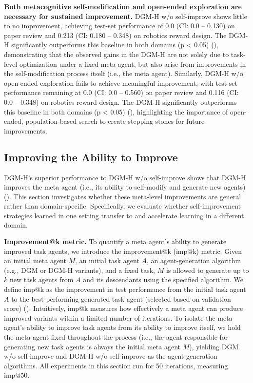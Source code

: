 \documentclass[]{fairmeta}
\begin{document}
\textbf{Both metacognitive self-modification and open-ended exploration are necessary for sustained improvement.}
DGM-H w/o self-improve \citep{huautomated} shows little to no improvement, achieving test-set performance of 0.0 (CI: 0.0 -- 0.130) on paper review and 0.213 (CI: 0.180 -- 0.348) on robotics reward design. The DGM-H significantly outperforms this baseline in both domains (p < 0.05) (), demonstrating that the observed gains in the DGM-H are not solely due to task-level optimization under a fixed meta agent, but also arise from improvements in the self-modification process itself (i.e., the meta agent).
Similarly, DGM-H w/o open-ended exploration fails to achieve meaningful improvement, with test-set performance remaining at 0.0 (CI: 0.0 -- 0.560) on paper review and 0.116 (CI: 0.0 -- 0.348) on robotics reward design. The DGM-H significantly outperforms this baseline in both domains (p < 0.05) (), highlighting the importance of open-ended, population-based search to create stepping stones for future improvements.

\subsection{Improving the Ability to Improve}
\label{sec:results-meta}

DGM-H's superior performance to DGM-H w/o self-improve shows that DGM-H improves the meta agent (i.e., its ability to self-modify and generate new agents) (). This section investigates whether these meta-level improvements are general rather than domain-specific. Specifically, we evaluate whether self-improvement strategies learned in one setting transfer to and accelerate learning in a different domain.

\textbf{Improvement@k metric.} To quantify a meta agent's ability to generate improved task agents, we introduce the improvement@k (imp@k) metric. Given an initial meta agent $M$, an initial task agent $A$, an agent-generation algorithm (e.g., DGM or DGM-H variants), and a fixed task, $M$ is allowed to generate up to $k$ new task agents from $A$ and its descendants using the specified algorithm. We define imp@k as the improvement in test performance from the initial task agent $A$ to the best-performing generated task agent (selected based on validation score) (). Intuitively, imp@k measures how effectively a meta agent can produce improved variants within a limited number of iterations. To isolate the meta agent's ability to improve task agents from its ability to improve itself, we hold the meta agent fixed throughout the process (i.e., the agent responsible for generating new task agents is always the initial meta agent $M$), yielding DGM w/o self-improve and DGM-H w/o self-improve as the agent-generation algorithms. All experiments in this section run for 50 iterations, measuring imp@50.
\end{document}
